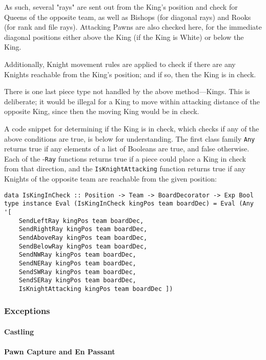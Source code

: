 \documentclass[12pt, a4paper, bibliography=totocnumbered]{scrreprt}
\newcommand{\inline}[1]{\lstinline[basicstyle=\ttfamily\footnotesize]{#1}}
\begin{document}
As such, several "rays" are sent out from the King's position and check for Queens of the opposite team, as well as Bishops (for diagonal rays) and Rooks (for rank and file rays). Attacking Pawns are also checked here, for the immediate diagonal positions either above the King (if the King is White) or below the King.

Additionally, Knight movement rules are applied to check if there are any Knights reachable from the King's position; and if so, then the King is in check.

There is one last piece type not handled by the above method---Kings. This is deliberate; it would be illegal for a King to move within attacking distance of the opposite King, since then the moving King would be in check.

A code snippet for determining if the King is in check, which checks if any of the above conditions are true, is below for understanding. The first class family \inline{Any} returns true if any elements of a list of Booleans are true, and false otherwise. Each of the -\inline{Ray} functions returns true if a piece could place a King in check from that direction, and the \inline{IsKnightAttacking} function returns true if any Knights of the opposite team are reachable from the given position:

\begin{lstlisting}
data IsKingInCheck :: Position -> Team -> BoardDecorator -> Exp Bool
type instance Eval (IsKingInCheck kingPos team boardDec) = Eval (Any '[
    SendLeftRay kingPos team boardDec,
    SendRightRay kingPos team boardDec,
    SendAboveRay kingPos team boardDec,
    SendBelowRay kingPos team boardDec, 
    SendNWRay kingPos team boardDec,
    SendNERay kingPos team boardDec,
    SendSWRay kingPos team boardDec,
    SendSERay kingPos team boardDec,
    IsKnightAttacking kingPos team boardDec ])
\end{lstlisting}

\subsubsection{Exceptions}

\paragraph{Castling}

\paragraph{Pawn Capture and En Passant}
\end{document}
